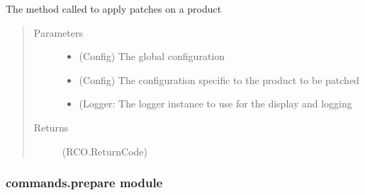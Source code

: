 \documentclass[a4paper,10pt,english]{sphinxmanual}
\begin{document}
\begin{fulllineitems}
\label{\detokenize{apidoc_commands/commands:commands.patch.apply_patch}}
The method called to apply patches on a product
\begin{quote}\begin{description}
\item[{Parameters}] \leavevmode\begin{itemize}
\item {} 
 \textendash{} (Config) The global configuration

\item {} 
 \textendash{} (Config) 
The configuration specific to the product to be patched

\item {} 
 \textendash{} (Logger: 
The logger instance to use for the display and logging

\end{itemize}

\item[{Returns}] \leavevmode
(RCO.ReturnCode)

\end{description}\end{quote}

\end{fulllineitems}



\subsubsection{commands.prepare module}
\label{\detokenize{apidoc_commands/commands:commands-prepare-module}}\label{\detokenize{apidoc_commands/commands:module-commands.prepare}}
\end{document}
